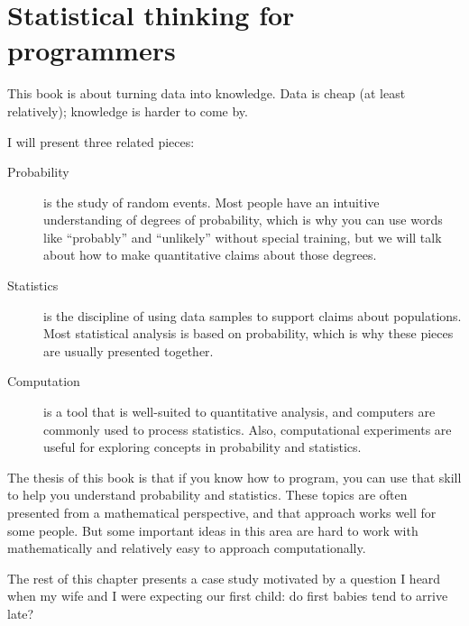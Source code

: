 \documentclass[12pt]{book}
\begin{document}
\begin{latexonly}

\tableofcontents

\clearemptydoublepage

\end{latexonly}

\mainmatter


\chapter{Statistical thinking for programmers}
\label{intro}

This book is about turning data into knowledge.  Data is cheap (at
least relatively); knowledge is harder to come by.

I will present three related pieces:

\begin{description}

\item[Probability] is the study of random events.  Most people have an
  intuitive understanding of degrees of probability, which is why you
  can use words like ``probably'' and ``unlikely'' without special
  training, but we will talk about how to make quantitative claims
  about those degrees.

\item[Statistics] is the discipline of using data samples to support
  claims about populations.  Most statistical analysis is based on
  probability, which is why these pieces are usually presented
  together.

\item[Computation] is a tool that is well-suited to quantitative
  analysis, and computers are commonly used to process statistics.
  Also, computational experiments
  are useful for exploring concepts in probability and statistics.

\end{description}

The thesis of this book is that if you know how to program, you can
use that skill to help you understand probability and statistics.
These topics are often presented from a mathematical perspective, and
that approach works well for some people.  But some important ideas
in this area are hard to work with mathematically and relatively
easy to approach computationally.

The rest of this chapter presents a case study motivated by a question
I heard when my wife and I were expecting our first child: do first
babies tend to arrive late?
\end{document}
